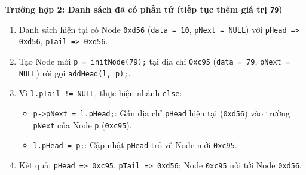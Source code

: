 \documentclass[12pt,a4paper]{article}
\begin{document}
\noindent\textbf{Trường hợp 2: Danh sách đã có phần tử (tiếp tục thêm giá trị \texttt{79})}
\begin{enumerate}[itemsep=0.15em]
    \item Danh sách hiện tại có Node \texttt{0xd56} (\texttt{data = 10}, \texttt{pNext = NULL}) với \texttt{pHead => 0xd56}, \texttt{pTail => 0xd56}.
    \item Tạo Node mới \texttt{p = initNode(79);} tại địa chỉ \texttt{0xc95} (\texttt{data = 79}, \texttt{pNext = NULL}) rồi gọi \texttt{addHead(l, p);}.
    \item Vì \texttt{l.pTail != NULL}, thực hiện nhánh \texttt{else}:
    \begin{itemize}[itemsep=0.1em]
        \item \texttt{p->pNext = l.pHead;}: Gán địa chỉ \texttt{pHead} hiện tại (\texttt{0xd56}) vào trường \texttt{pNext} của Node \texttt{p} (\texttt{0xc95}).
        \item \texttt{l.pHead = p;}: Cập nhật \texttt{pHead} trỏ về Node mới \texttt{0xc95}.
    \end{itemize}
    \item Kết quả: \texttt{pHead => 0xc95}, \texttt{pTail => 0xd56}; Node \texttt{0xc95} nối tới Node \texttt{0xd56}.
\end{enumerate}
\end{document}
